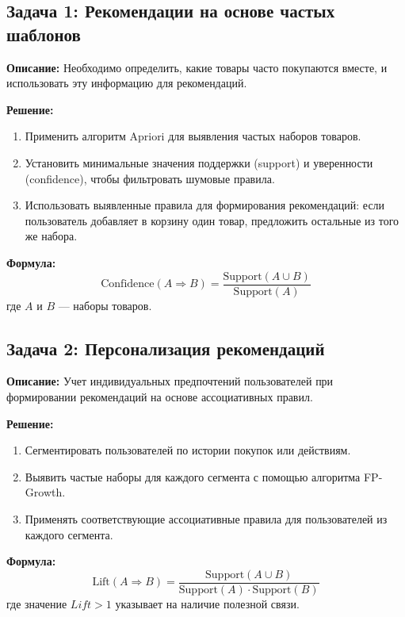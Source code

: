 \subsection{Задача 1: Рекомендации на основе частых шаблонов}
\textbf{Описание:} 
Необходимо определить, какие товары часто покупаются вместе, и использовать эту информацию для рекомендаций.

\textbf{Решение:}
\begin{enumerate}
    \item Применить алгоритм Apriori для выявления частых наборов товаров.
    \item Установить минимальные значения поддержки (support) и уверенности (confidence), чтобы фильтровать шумовые правила.
    \item Использовать выявленные правила для формирования рекомендаций: если пользователь добавляет в корзину один товар, предложить остальные из того же набора.
\end{enumerate}

\textbf{Формула:}
\begin{equation}
    \text{Confidence}(A \Rightarrow B) = \frac{\text{Support}(A \cup B)}{\text{Support}(A)}
\end{equation}
где $A$ и $B$ — наборы товаров.

\subsection{Задача 2: Персонализация рекомендаций}
\textbf{Описание:}
Учет индивидуальных предпочтений пользователей при формировании рекомендаций на основе ассоциативных правил.

\textbf{Решение:}
\begin{enumerate}
    \item Сегментировать пользователей по истории покупок или действиям.
    \item Выявить частые наборы для каждого сегмента с помощью алгоритма FP-Growth.
    \item Применять соответствующие ассоциативные правила для пользователей из каждого сегмента.
\end{enumerate}

\textbf{Формула:}
\begin{equation}
    \text{Lift}(A \Rightarrow B) = \frac{\text{Support}(A \cup B)}{\text{Support}(A) \cdot \text{Support}(B)}
\end{equation}
где значение $Lift > 1$ указывает на наличие полезной связи.

